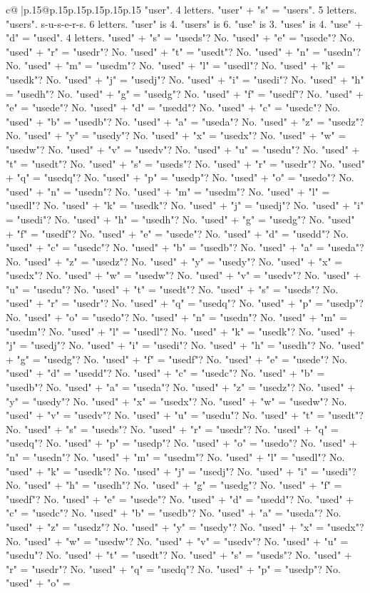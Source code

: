 \documentclass{article}
\begin{document}
{\begin{supertabular}{c@{$\;$}|p{.15\linewidth}@{}p{.15\linewidth}p{.15\linewidth}p{.15\linewidth}p{.15\linewidth}p{.15\linewidth}}
{{{"user". 4 letters. "user" + "s" = "users". 5 letters. "users". s{-}u{-}s{-}e{-}r{-}s. 6 letters. "user" is 4. "users" is 6. "use" is 3. "uses" is 4. "use" + "d" = "used". 4 letters. "used" + "s" = "useds"? No. "used" + "e" = "usede"? No. "used" + "r" = "usedr"? No. "used" + "t" = "usedt"? No. "used" + "n" = "usedn"? No. "used" + "m" = "usedm"? No. "used" + "l" = "usedl"? No. "used" + "k" = "usedk"? No. "used" + "j" = "usedj"? No. "used" + "i" = "usedi"? No. "used" + "h" = "usedh"? No. "used" + "g" = "usedg"? No. "used" + "f" = "usedf"? No. "used" + "e" = "usede"? No. "used" + "d" = "usedd"? No. "used" + "c" = "usedc"? No. "used" + "b" = "usedb"? No. "used" + "a" = "useda"? No. "used" + "z" = "usedz"? No. "used" + "y" = "usedy"? No. "used" + "x" = "usedx"? No. "used" + "w" = "usedw"? No. "used" + "v" = "usedv"? No. "used" + "u" = "usedu"? No. "used" + "t" = "usedt"? No. "used" + "s" = "useds"? No. "used" + "r" = "usedr"? No. "used" + "q" = "usedq"? No. "used" + "p" = "usedp"? No. "used" + "o" = "usedo"? No. "used" + "n" = "usedn"? No. "used" + "m" = "usedm"? No. "used" + "l" = "usedl"? No. "used" + "k" = "usedk"? No. "used" + "j" = "usedj"? No. "used" + "i" = "usedi"? No. "used" + "h" = "usedh"? No. "used" + "g" = "usedg"? No. "used" + "f" = "usedf"? No. "used" + "e" = "usede"? No. "used" + "d" = "usedd"? No. "used" + "c" = "usedc"? No. "used" + "b" = "usedb"? No. "used" + "a" = "useda"? No. "used" + "z" = "usedz"? No. "used" + "y" = "usedy"? No. "used" + "x" = "usedx"? No. "used" + "w" = "usedw"? No. "used" + "v" = "usedv"? No. "used" + "u" = "usedu"? No. "used" + "t" = "usedt"? No. "used" + "s" = "useds"? No. "used" + "r" = "usedr"? No. "used" + "q" = "usedq"? No. "used" + "p" = "usedp"? No. "used" + "o" = "usedo"? No. "used" + "n" = "usedn"? No. "used" + "m" = "usedm"? No. "used" + "l" = "usedl"? No. "used" + "k" = "usedk"? No. "used" + "j" = "usedj"? No. "used" + "i" = "usedi"? No. "used" + "h" = "usedh"? No. "used" + "g" = "usedg"? No. "used" + "f" = "usedf"? No. "used" + "e" = "usede"? No. "used" + "d" = "usedd"? No. "used" + "c" = "usedc"? No. "used" + "b" = "usedb"? No. "used" + "a" = "useda"? No. "used" + "z" = "usedz"? No. "used" + "y" = "usedy"? No. "used" + "x" = "usedx"? No. "used" + "w" = "usedw"? No. "used" + "v" = "usedv"? No. "used" + "u" = "usedu"? No. "used" + "t" = "usedt"? No. "used" + "s" = "useds"? No. "used" + "r" = "usedr"? No. "used" + "q" = "usedq"? No. "used" + "p" = "usedp"? No. "used" + "o" = "usedo"? No. "used" + "n" = "usedn"? No. "used" + "m" = "usedm"? No. "used" + "l" = "usedl"? No. "used" + "k" = "usedk"? No. "used" + "j" = "usedj"? No. "used" + "i" = "usedi"? No. "used" + "h" = "usedh"? No. "used" + "g" = "usedg"? No. "used" + "f" = "usedf"? No. "used" + "e" = "usede"? No. "used" + "d" = "usedd"? No. "used" + "c" = "usedc"? No. "used" + "b" = "usedb"? No. "used" + "a" = "useda"? No. "used" + "z" = "usedz"? No. "used" + "y" = "usedy"? No. "used" + "x" = "usedx"? No. "used" + "w" = "usedw"? No. "used" + "v" = "usedv"? No. "used" + "u" = "usedu"? No. "used" + "t" = "usedt"? No. "used" + "s" = "useds"? No. "used" + "r" = "usedr"? No. "used" + "q" = "usedq"? No. "used" + "p" = "usedp"? No. "used" + "o" = }}}
\end{supertabular}}
\end{document}
